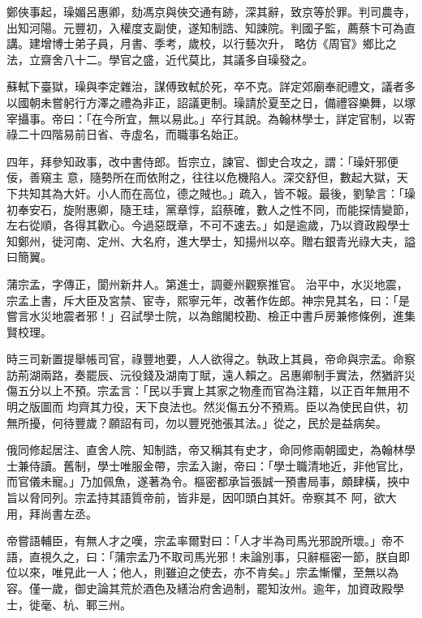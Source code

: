 \begin{pinyinscope}
 鄭俠事起，璪媚呂惠卿，劾馮京與俠交通有跡，深其辭，致京等於罪。判司農寺，出知河陽。元豐初，入權度支副使，遂知制誥、知諫院。判國子監，薦蔡卞可為直講。建增博士弟子員，月書、季考，歲校，以行藝次升，
 略仿《周官》鄉比之法，立齋舍八十二。學官之盛，近代莫比，其議多自璪發之。



 蘇軾下臺獄，璪與李定雜治，謀傅致軾於死，卒不克。詳定郊廟奉祀禮文，議者多以國朝未嘗躬行方澤之禮為非正，詔議更制。璪請於夏至之日，備禮容樂舞，以塚宰攝事。帝曰：「在今所宜，無以易此。」卒行其說。為翰林學士，詳定官制，以寄祿二十四階易前日省、寺虛名，而職事名始正。



 四年，拜參知政事，改中書侍郎。哲宗立，諫官、御史合攻之，謂：「璪奸邪便佞，善窺主
 意，隨勢所在而依附之，往往以危機陷人。深交舒但，數起大獄，天下共知其為大奸。小人而在高位，德之賊也。」疏入，皆不報。最後，劉摯言：「璪初奉安石，旋附惠卿，隨王珪，黨章惇，諂蔡確，數人之性不同，而能探情變節，左右從順，各得其歡心。今過惡既章，不可不速去。」如是逾歲，乃以資政殿學士知鄭州，徙河南、定州、大名府，進大學士，知揚州以卒。贈右銀青光祿大夫，謚曰簡翼。



 蒲宗孟，字傳正，閬州新井人。第進士，調夔州觀察推官。
 治平中，水災地震，宗孟上書，斥大臣及宮禁、宦寺，熙寧元年，改著作佐郎。神宗見其名，曰：「是嘗言水災地震者邪！」召試學士院，以為館閣校勘、檢正中書戶房兼修條例，進集賢校理。



 時三司新置提舉帳司官，祿豐地要，人人欲得之。執政上其員，帝命與宗孟。命察訪荊湖兩路，奏罷辰、沅役錢及湖南丁賦，遠人賴之。呂惠卿制手實法，然猶許災傷五分以上不預。宗孟言：「民以手實上其家之物產而官為注籍，以正百年無用不明之版圖而
 均齊其力役，天下良法也。然災傷五分不預焉。臣以為使民自供，初無所擾，何待豐歲？願詔有司，勿以豐兇弛張其法。」從之，民於是益病矣。



 俄同修起居注、直舍人院、知制誥，帝又稱其有史才，命同修兩朝國史，為翰林學士兼侍讀。舊制，學士唯服金帶，宗孟入謝，帝曰：「學士職清地近，非他官比，而官儀未寵。」乃加佩魚，遂著為令。樞密都承旨張誠一預書局事，頗肆橫，挾中旨以脅同列。宗孟持其語質帝前，皆非是，因叩頭白其奸。帝察其不
 阿，欲大用，拜尚書左丞。



 帝嘗語輔臣，有無人才之嘆，宗孟率爾對曰：「人才半為司馬光邪說所壞。」帝不語，直視久之，曰：「蒲宗孟乃不取司馬光邪！未論別事，只辭樞密一節，朕自即位以來，唯見此一人；他人，則雖迫之使去，亦不肯矣。」宗孟慚懼，至無以為容。僅一歲，御史論其荒於酒色及繕治府舍過制，罷知汝州。逾年，加資政殿學士，徙毫、杭、鄆三州。




\end{pinyinscope}
